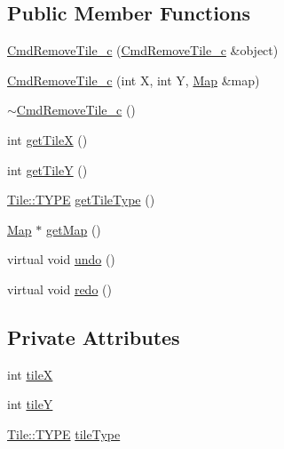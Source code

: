 \subsection*{Public Member Functions}
\begin{DoxyCompactItemize}
\item 
\hyperlink{class_cmd_remove_tile__c_a60a33c5acc5f4ec8580a822a5a3c2060}{Cmd\+Remove\+Tile\+\_\+c} (\hyperlink{class_cmd_remove_tile__c}{Cmd\+Remove\+Tile\+\_\+c} \&object)
\item 
\hyperlink{class_cmd_remove_tile__c_a33fb533505684428a8ad92583618d6f2}{Cmd\+Remove\+Tile\+\_\+c} (int X, int Y, \hyperlink{class_map}{Map} \&map)
\item 
\hyperlink{class_cmd_remove_tile__c_a592ff615491a7747f043bc02d312d9ad}{$\sim$\+Cmd\+Remove\+Tile\+\_\+c} ()
\item 
int \hyperlink{class_cmd_remove_tile__c_a685d79e52c063ed2d0c8b54d7edeeca6}{get\+Tile\+X} ()
\item 
int \hyperlink{class_cmd_remove_tile__c_a5c34e198729428936017049e92660773}{get\+Tile\+Y} ()
\item 
\hyperlink{class_tile_acb53d82f9dacff45a98acc63276928eb}{Tile\+::\+T\+Y\+P\+E} \hyperlink{class_cmd_remove_tile__c_aab2bf5508fc6b40f0734c7b6689961d1}{get\+Tile\+Type} ()
\item 
\hyperlink{class_map}{Map} $\ast$ \hyperlink{class_cmd_remove_tile__c_a926aa1e6bd1b37b5527e34b36559d88f}{get\+Map} ()
\item 
virtual void \hyperlink{class_cmd_remove_tile__c_a739dac75f48718fd9f3bd90b7cba59b1}{undo} ()
\item 
virtual void \hyperlink{class_cmd_remove_tile__c_ab423f8f77192b2772f245feb82c96cb4}{redo} ()
\end{DoxyCompactItemize}
\subsection*{Private Attributes}
\begin{DoxyCompactItemize}
\item 
int \hyperlink{class_cmd_remove_tile__c_a59d402f518e7e7b9682e80cc8882ca78}{tile\+X}
\item 
int \hyperlink{class_cmd_remove_tile__c_aa76c6c8cca931cb8d9a70263494f8cec}{tile\+Y}
\item 
\hyperlink{class_tile_acb53d82f9dacff45a98acc63276928eb}{Tile\+::\+T\+Y\+P\+E} \hyperlink{class_cmd_remove_tile__c_a1d7eeadf66dc25b16f70db109e9445cd}{tile\+Type}
\end{DoxyCompactItemize}
